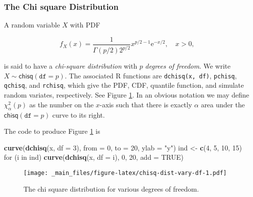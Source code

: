 \documentclass[]{book}
\newenvironment{Shaded}{\begin{snugshade}}{\end{snugshade}}
\newcommand{\KeywordTok}[1]{\textcolor[rgb]{0.13,0.29,0.53}{\textbf{{#1}}}}
\newcommand{\DataTypeTok}[1]{\textcolor[rgb]{0.13,0.29,0.53}{{#1}}}
\newcommand{\DecValTok}[1]{\textcolor[rgb]{0.00,0.00,0.81}{{#1}}}
\newcommand{\StringTok}[1]{\textcolor[rgb]{0.31,0.60,0.02}{{#1}}}
\newcommand{\OtherTok}[1]{\textcolor[rgb]{0.56,0.35,0.01}{{#1}}}
\newcommand{\NormalTok}[1]{{#1}}
\numberwithin{equation}{chapter}
\numberwithin{figure}{chapter}
\theoremstyle{plain}
\theoremstyle{definition}
\theoremstyle{remark}
\theoremstyle{definition}
\theoremstyle{definition}
\theoremstyle{remark}
\begin{document}
\subsubsection{The Chi square Distribution}\label{sub-the-chi-square}

A random variable \(X\) with PDF

\begin{equation}
f_{X}(x)=\frac{1}{\Gamma(p/2)2^{p/2}}x^{p/2-1}\mathrm{e}^{-x/2},\quad x>0,
\end{equation}

is said to have a \emph{chi-square distribution} with \(p\)
\emph{degrees of freedom}. We write
\(X\sim\mathsf{chisq}(\mathtt{df}=p)\). The associated R functions are
\texttt{dchisq(x,\ df)}, \texttt{pchisq}, \texttt{qchisq}, and
\texttt{rchisq}, which give the PDF, CDF, quantile function, and
simulate random variates, respectively. See Figure
\ref{fig:chisq-dist-vary-df}. In an obvious notation we may define
\(\chi_{\alpha}^{2}(p)\) as the number on the \(x\)-axis such that there
is exactly \(\alpha\) area under the \(\mathsf{chisq}(\mathtt{df}=p)\)
curve to its right.

The code to produce Figure \ref{fig:chisq-dist-vary-df} is

\begin{Shaded}
\begin{Highlighting}[]
\KeywordTok{curve}\NormalTok{(}\KeywordTok{dchisq}\NormalTok{(x, }\DataTypeTok{df =} \DecValTok{3}\NormalTok{), }\DataTypeTok{from =} \DecValTok{0}\NormalTok{, }\DataTypeTok{to =} \DecValTok{20}\NormalTok{, }\DataTypeTok{ylab =} \StringTok{"y"}\NormalTok{)}
\NormalTok{ind <-}\StringTok{ }\KeywordTok{c}\NormalTok{(}\DecValTok{4}\NormalTok{, }\DecValTok{5}\NormalTok{, }\DecValTok{10}\NormalTok{, }\DecValTok{15}\NormalTok{)}
\NormalTok{for (i in ind) }\KeywordTok{curve}\NormalTok{(}\KeywordTok{dchisq}\NormalTok{(x, }\DataTypeTok{df =} \NormalTok{i), }\DecValTok{0}\NormalTok{, }\DecValTok{20}\NormalTok{, }\DataTypeTok{add =} \OtherTok{TRUE}\NormalTok{)}
\end{Highlighting}
\end{Shaded}

\begin{figure}[htbp]
\centering
\texttt{[image: \_main\_files/figure-latex/chisq-dist-vary-df-1.pdf]}
\caption{\label{fig:chisq-dist-vary-df}\small The chi square distribution for
various degrees of freedom.}
\end{figure}
\end{document}

